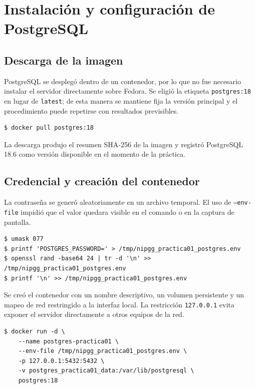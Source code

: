 \section{Instalación y configuración de PostgreSQL}

\subsection{Descarga de la imagen}

PostgreSQL se desplegó dentro de un contenedor, por lo que no fue necesario
instalar el servidor directamente sobre Fedora. Se eligió la etiqueta
\texttt{postgres:18} en lugar de \texttt{latest}; de esta manera se mantiene
fija la versión principal y el procedimiento puede repetirse con resultados
previsibles.

\begin{lstlisting}[style=terminal]
$ docker pull postgres:18
\end{lstlisting}

La descarga produjo el resumen SHA-256 de la imagen y registró PostgreSQL 18.6
como versión disponible en el momento de la práctica.

\subsection{Credencial y creación del contenedor}

La contraseña se generó aleatoriamente en un archivo temporal. El uso de
\texttt{--env-file} impidió que el valor quedara visible en el comando o en la
captura de pantalla.

\begin{lstlisting}[style=terminal]
$ umask 077
$ printf 'POSTGRES_PASSWORD=' > /tmp/nipgg_practica01_postgres.env
$ openssl rand -base64 24 | tr -d '\n' >> /tmp/nipgg_practica01_postgres.env
$ printf '\n' >> /tmp/nipgg_practica01_postgres.env
\end{lstlisting}

Se creó el contenedor con un nombre descriptivo, un volumen persistente y un
mapeo de red restringido a la interfaz local. La restricción
\texttt{127.0.0.1} evita exponer el servidor directamente a otros equipos de la
red.

\begin{lstlisting}[style=terminal]
$ docker run -d \
    --name postgres-practica01 \
    --env-file /tmp/nipgg_practica01_postgres.env \
    -p 127.0.0.1:5432:5432 \
    -v postgres_practica01_data:/var/lib/postgresql \
    postgres:18
\end{lstlisting}


